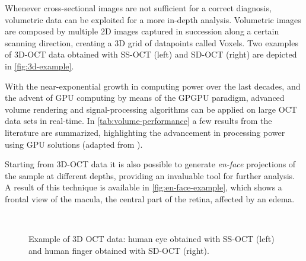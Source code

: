 Whenever cross-sectional images are not sufficient for a correct diagnosis, volumetric data can be exploited for a more in-depth analysis. Volumetric images are composed by multiple 2D images captured in succession along a certain scanning direction, creating a 3D grid of datapoints called Voxels.  Two examples of 3D-OCT data obtained with SS-OCT (left) \citep{Dhalla2012} and SD-OCT (right) \citep{Choi2012} are depicted in \autoref{fig:3d-example}. 

With the near-exponential growth in computing power over the last decades, and the advent of \ac{GPU} computing by means of the \ac{GPGPU} paradigm, advanced volume rendering and signal-processing algorithms can be applied on large OCT data sets in real-time. In \autoref{tab:volume-performance} a few results from the literature are summarized, highlighting the advancement in processing power using GPU solutions (adapted from \citep{Darbrazi2016}).

Starting from 3D-OCT data it is also possible to generate \emph{en-face} projections of the sample at different depths, providing an invaluable tool for further analysis. A result of this technique is available in \autoref{fig:en-face-example}, which shows a frontal view of the macula, the central part of the retina, affected by an edema.

\begin{figure}[hbt]
\myfloatalign
{} \quad
{}\\
\caption{Example of 3D OCT data: human eye obtained with SS-OCT \citep{Dhalla2012} (left) and human finger obtained with SD-OCT \citep{Choi2012} (right).}\label{fig:3d-example}
\end{figure}

